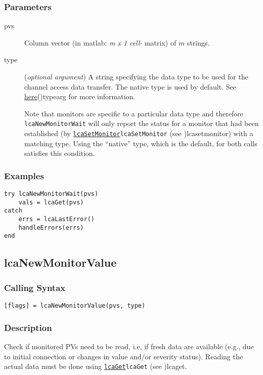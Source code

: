 \documentclass{article}
\newcommand{\com}[1]{{\tt #1}}
\newcommand{\pbrk}{\pagebreak[3]}
\newcommand{\comref}[2]{\hyperref[ref]{\com{#1}}{\com{#1} (see }{)}{#2}}
\newcommand{\ita}[1]{\emph{#1}}
\newcommand{\m}{$m$}
\newcommand{\mhack}{$m$} %
\newcommand{\mxl}{$m\times 1$}
\renewcommand{\m}{\ita{m}}
\newcommand{\mhack}{\ita{m}} %
\renewcommand{\mxl}{\ita{m x 1}}
\renewcommand{\pbrk}{}
\newcommand{\PVITEM}{
\item[pvs] Column vector (in matlab: \mxl{} \ita{cell-} matrix)
of \mhack{} strings.
}
\begin{document}
\subsubsection{Parameters}
\begin{description}
\PVITEM
\item[type]
(\ita{optional argument}) A string specifying the
data type to be used for the channel access data transfer. The
native type is used by default.
See \hyperref[ref]{here}{(}{)}{typearg} for more information.

Note that monitors are specific to a particular data type and therefore
\com{lcaNewMonitorWait} will only report the status for a monitor that had been established
(by \comref{lcaSetMonitor}{lcasetmonitor}) with a matching type.
Using the ``native'' type, which is the default, for both calls
satisfies this condition.
\end{description}
\subsubsection{Examples}
\begin{verbatim}
try lcaNewMonitorWait(pvs)
	vals = lcaGet(pvs)
catch
	errs = lcaLastError()
	handleErrors(errs)
end
\end{verbatim}

\pbrk
\subsection{lcaNewMonitorValue}
\label{lcanewmonitorvalue}
\subsubsection{Calling Syntax}
\begin{verbatim}
[flags] = lcaNewMonitorValue(pvs, type)
\end{verbatim}
\subsubsection{Description}
Check if monitored PVs need to be read, i.e, if fresh data are available (e.g., due to
initial connection or changes in value and/or severity status). Reading the actual
data must be done using \comref{lcaGet}{lcaget}.
\end{document}
